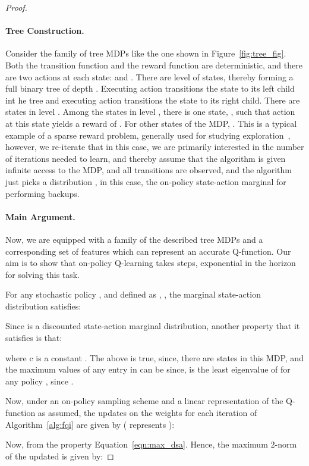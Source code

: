 \documentclass[jmlr]{article}
\begin{document}
\begin{proof}
\paragraph{Tree Construction.} Consider the family of tree MDPs like the one shown in Figure~\ref{fig:tree_fig}. Both the transition function  and the reward function  are deterministic, and there are two actions at each state:  and . There are  level of states, thereby forming a full binary tree of depth . Executing action  transitions the state to its left child int he tree and executing action  transitions the state to its right child. There are  states in level . Among the  states in level , there is one state, , such that action  at this state yields a reward of . For other states of the MDP, . This is a typical example of a sparse reward problem, generally used for studying exploration~\cite{du2020is}, however, we re-iterate that in this case, we are primarily interested in the number of iterations needed to learn, and thereby assume that the algorithm is given infinite access to the MDP, and all transitions are observed, and the algorithm just picks a distribution , in this case, the on-policy state-action marginal for performing backups.
 
\paragraph{Main Argument.} Now, we are equipped with a family of the described tree MDPs and a corresponding set of features  which can represent an accurate Q-function. Our aim is to show that on-policy Q-learning takes steps, exponential in the horizon for solving this task.

For any stochastic policy , and  defined as , , the marginal state-action distribution satisfies:
 
Since  is a discounted state-action marginal distribution, another property that it satisfies is that:

where c is a constant . The above is true, since, there are  states in this MDP, and the maximum values of any entry in  can be  since,  is the least eigenvalue of  for any policy , since . 

Now, under an on-policy sampling scheme and a linear representation of the Q-function as assumed, the updates on the weights for each iteration of Algorithm~\ref{alg:fqi} are given by ( represents ): 

Now,  from the property Equation~\ref{eqn:max_dsa}. Hence, the maximum 2-norm of the updated  is given by:


\end{proof}
\end{document}
